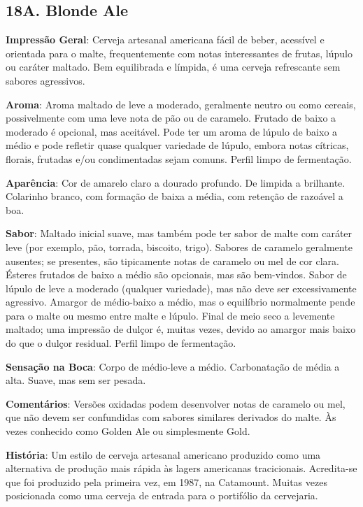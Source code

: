 \subsection*{18A. Blonde Ale}
\textbf{Impressão Geral}: Cerveja artesanal americana fácil de beber, acessível e orientada para o malte, frequentemente com notas interessantes de frutas, lúpulo ou caráter maltado. Bem equilibrada e límpida, é uma cerveja refrescante sem sabores agressivos.

\textbf{Aroma}: Aroma maltado de leve a moderado, geralmente neutro ou como cereais, possivelmente com uma leve nota de pão ou de caramelo. Frutado de baixo a moderado é opcional, mas aceitável. Pode ter um aroma de lúpulo de baixo a médio e pode refletir quase qualquer variedade de lúpulo, embora notas cítricas, florais, frutadas e/ou condimentadas sejam comuns. Perfil limpo de fermentação.

\textbf{Aparência}: Cor de amarelo claro a dourado profundo. De limpida a brilhante. Colarinho branco, com formação de baixa a média, com retenção de razoável a boa.

\textbf{Sabor}: Maltado inicial suave, mas também pode ter sabor de malte com caráter leve (por exemplo, pão, torrada, biscoito, trigo). Sabores de caramelo geralmente ausentes; se presentes, são tipicamente notas de caramelo ou mel de cor clara. Ésteres frutados de baixo a médio são opcionais, mas são bem-vindos. Sabor de lúpulo de leve a moderado (qualquer variedade), mas não deve ser excessivamente agressivo. Amargor de médio-baixo a médio, mas o equilíbrio normalmente pende para o malte ou mesmo entre malte e lúpulo. Final de meio seco a levemente maltado; uma impressão de dulçor é, muitas vezes, devido ao amargor mais baixo do que o dulçor residual. Perfil limpo de fermentação.

\textbf{Sensação na Boca}: Corpo de médio-leve a médio. Carbonatação de média a alta. Suave, mas sem ser pesada.

\textbf{Comentários}: Versões oxidadas podem desenvolver notas de caramelo ou mel, que não devem ser confundidas com sabores similares derivados do malte. Às vezes conhecido como Golden Ale ou simplesmente Gold.

\textbf{História}: Um estilo de cerveja artesanal americano produzido como uma alternativa de produção mais rápida às lagers americanas tracicionais. Acredita-se que foi produzido pela primeira vez, em 1987, na Catamount. Muitas vezes posicionada como uma cerveja de entrada para o portifólio da cervejaria.

